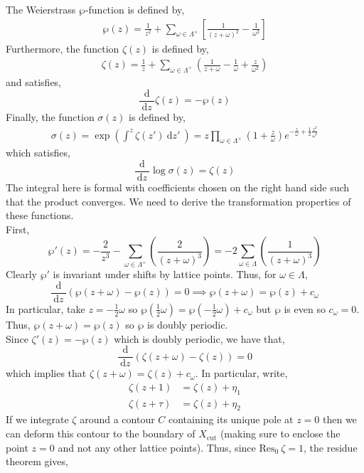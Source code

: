 \documentclass[12pt]{extarticle}
\renewcommand{\d}[1]{\: \mathrm{d}#1 \:}
\newcommand{\deriv}[2]{\frac{\d{#1}}{\d{#2}}}
\theoremstyle{definition}
\newcommand{\Res}[2]{\mathrm{Res}_{#1} \: #2}
\newcommand{\Xcut}{X_{\text{cut}}}
\begin{document}
The Weierstrass $\wp$-function is defined by,
\begin{align*}
\wp(z) = \frac{1}{z^2} + \sum_{\omega \in \Lambda^\times} \left[ \frac{1}{(z + \omega)^2} - \frac{1}{\omega^2} \right]
\end{align*}
Furthermore, the function $\zeta(z)$ is defined by,
\begin{align*}
\zeta(z) = \frac{1}{z} + \sum_{\omega \in \Lambda^\times} \left( \frac{1}{z + \omega} - \frac{1}{\omega} + \frac{z}{\omega^2} \right)
\end{align*}
and satisfies,
\[ \deriv{}{z} \zeta(z) = - \wp(z) \]
Finally, the function $\sigma(z)$ is defined by,
\begin{align*}
\sigma(z) = \exp{\left( \int^z \zeta(z') \d{z'} \right)} = z \prod_{\omega \in \Lambda^\times} \left(1 + \frac{z}{\omega} \right) e^{- \frac{z}{\omega} + \frac{1}{2} \frac{z^2}{\omega^2}} 
\end{align*}
which satisfies,
\[ \deriv{}{z} \log{\sigma(z)} = \zeta(z) \]
The integral here is formal with coefficients chosen on the right hand side such that the product converges.
We need to derive the transformation properties of these functions. 
\bigskip\\
First,
\[ \wp'(z) = - \frac{2}{z^3} - \sum_{\omega \in \Lambda^\times} \left( \frac{2}{(z + \omega)^3} \right) = - 2 \sum_{\omega \in \Lambda} \left( \frac{1}{(z + \omega)^3} \right) \]
Clearly $\wp'$ is invariant under shifts by lattice points. Thus, for $\omega \in \Lambda$,
\[ \deriv{}{z} \left( \wp(z + \omega) - \wp(z) \right) = 0 \implies \wp(z + \omega) = \wp(z) + c_\omega \]
In particular, take $z = -\frac{1}{2} \omega$ so $\wp(\frac{1}{2} \omega) = \wp(-\frac{1}{2} \omega) + c_\omega$ but $\wp$ is even so $c_\omega = 0$. Thus, $\wp(z + \omega) = \wp(z)$ so $\wp$ is doubly periodic.
\bigskip\\
Since $\zeta'(z) = - \wp(z)$ which is doubly periodic, we have that,
\[ \deriv{}{z} \left( \zeta(z + \omega) - \zeta(z) \right) = 0 \]
which implies that $\zeta(z + \omega) = \zeta(z) + c_\omega$. In particular, write,
\begin{align*}
\zeta(z + 1) & = \zeta(z) + \eta_1
\\
\zeta(z + \tau) & = \zeta(z) + \eta_2
\end{align*}
If we integrate $\zeta$ around a contour $C$ containing its unique pole at $z = 0$ then we can deform this contour to the boundary of $\Xcut$ (making sure to enclose the point $z = 0$ and not any other lattice points). Thus, since $\Res{0}{\zeta} = 1$, the residue theorem gives,
\end{document}
